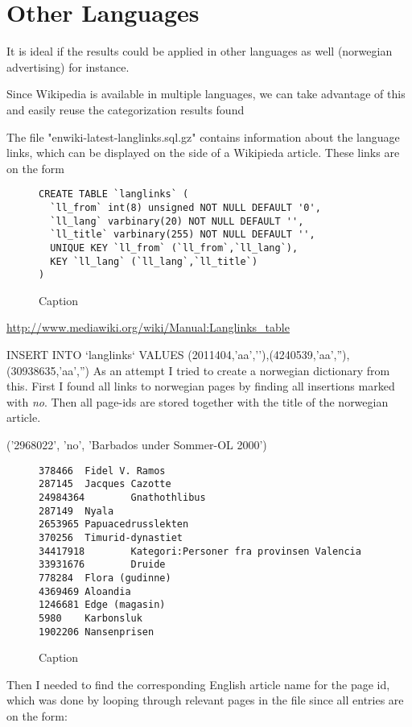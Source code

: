 \section{Other Languages}
It is ideal if the results could be applied in other languages as well (norwegian advertising) for instance. 

Since Wikipedia is available in multiple languages, we can take advantage of this and easily reuse the categorization results found 

The file "enwiki-latest-langlinks.sql.gz" contains information about the language links, which can be displayed on the side of a Wikipieda article. These links are on the form

\begin{figure}[h]
\centering
\begin{lstlisting}
CREATE TABLE `langlinks` (
  `ll_from` int(8) unsigned NOT NULL DEFAULT '0',
  `ll_lang` varbinary(20) NOT NULL DEFAULT '',
  `ll_title` varbinary(255) NOT NULL DEFAULT '',
  UNIQUE KEY `ll_from` (`ll_from`,`ll_lang`),
  KEY `ll_lang` (`ll_lang`,`ll_title`)
)
\end{lstlisting}
\caption{Caption}
\label{fig:my_label}
\end{figure}

\url{http://www.mediawiki.org/wiki/Manual:Langlinks\_table}

INSERT INTO `langlinks` VALUES (2011404,'aa',''),(4240539,'aa',''),(30938635,'aa','')
As an attempt I tried to create a norwegian dictionary from this. 
First I found all links to norwegian pages by finding all insertions marked with \emph{no}. Then all page-ids are stored together with the title of the norwegian article. 
 
('2968022', 'no', 'Barbados under Sommer-OL 2000')
 
\begin{figure}[h]
\centering
\begin{lstlisting}
378466  Fidel V. Ramos
287145  Jacques Cazotte
24984364        Gnathothlibus
287149  Nyala
2653965 Papuacedrusslekten
370256  Timurid-dynastiet
34417918        Kategori:Personer fra provinsen Valencia
33931676        Druide
778284  Flora (gudinne)
4369469 Aloandia
1246681 Edge (magasin)
5980    Karbonsluk
1902206 Nansenprisen
\end{lstlisting}
\caption{Caption}
\label{fig:my_label}
\end{figure}
 
Then I needed to find the corresponding English article name for the page id, which was done by looping through relevant pages in the \enwikicatlink file since all entries are on the form: 
 
